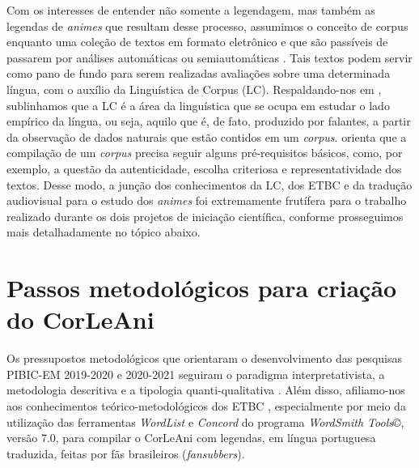 \documentclass[portuguese]{textolivre}
\begin{document}
Com os interesses de entender não somente a legendagem, mas também as legendas de \textit{animes} que resultam desse processo, assumimos o conceito de corpus enquanto uma coleção de textos em formato eletrônico e que são passíveis de passarem por análises automáticas ou semiautomáticas \cite{baker_corpus-based_1996}. Tais textos podem servir como pano de fundo para serem realizadas avaliações sobre uma determinada língua, com o auxílio da Linguística de Corpus (LC). Respaldando-nos em \textcite{mcenery_corpus_2001}, sublinhamos que a LC é a área da linguística que se ocupa em estudar o lado empírico da língua, ou seja, aquilo que é, de fato, produzido por falantes, a partir da observação de dados naturais que estão contidos em um \textit{corpus}. \textcite{sardinha_linguistica_2004} orienta que a compilação de um \textit{corpus} precisa seguir alguns pré-requisitos básicos, como, por exemplo, a questão da autenticidade, escolha criteriosa e representatividade dos textos. Desse modo, a junção dos conhecimentos da LC, dos ETBC e da tradução audiovisual para o estudo dos \textit{animes} foi  extremamente frutífera para o trabalho realizado durante os dois projetos de iniciação científica, conforme prosseguimos mais detalhadamente no tópico abaixo.

\section{Passos metodológicos para criação do CorLeAni}\label{sec-conduta}
Os pressupostos metodológicos que orientaram o desenvolvimento das pesquisas PIBIC-EM 2019-2020 e 2020-2021 seguiram o paradigma interpretativista, a metodologia descritiva e a tipologia quanti-qualitativa \cite{moreira_metodologia_2008}. Além disso, afiliamo-nos aos conhecimentos teórico-metodológicos dos ETBC \cite{baker_corpora_1995,baker_corpus-based_1996,camargo_metodologia_2007}, especialmente por meio da utilização das ferramentas \textit{WordList} e \textit{Concord} do programa \textit{WordSmith Tools©}, versão 7.0, para compilar o CorLeAni com legendas, em língua portuguesa traduzida, feitas por fãs brasileiros (\textit{fansubbers}).
\end{document}
